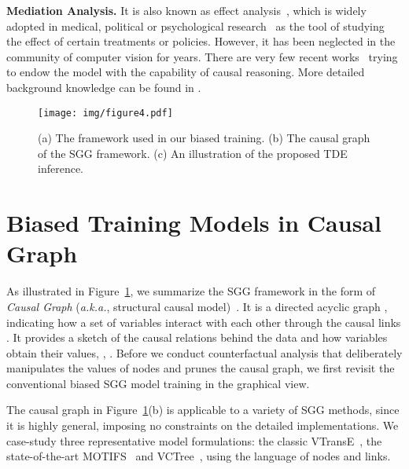 \documentclass[10pt,twocolumn,letterpaper]{article}
\begin{document}
\noindent\textbf{Mediation Analysis.} It is also known as effect analysis~\cite{vanderweele2015explanation, Judea2018thebookofwhy}, which is widely adopted in medical, political or psychological research~\cite{richiardi2013mediation, keele2015statistics, dunn2015evaluation, mackinnon2007mediation, king2008political} as the tool of studying the effect of certain treatments or policies. However, it has been neglected in the community of computer vision for years. There are very few recent works~\cite{nair2019causal, kusner2017counterfactual, niu2020counterfactual, qi2019two, wang2020visual, yang2020deconfounded} trying to endow the model with the capability of causal reasoning. More detailed background knowledge can be found in \cite{pearl2016causal,Judea2018thebookofwhy, vanderweele2015explanation}. 

%
 



\begin{figure}[t]
   \begin{minipage}[b]{1.0\linewidth}
   \centerline{\texttt{[image: img/figure4.pdf]}}
   \end{minipage}
   \caption{(a) The framework used in our biased training. (b) The causal graph of the SGG framework. (c) An illustration of the proposed TDE inference.}
   \label{fig:4} \vspace{-0.2in}
\end{figure}

\section{Biased Training Models in Causal Graph}
\label{sec:biased_training}
As illustrated in Figure~\ref{fig:4}, we summarize the SGG framework in the form of \textit{Causal Graph} (\textit{a.k.a.}, structural causal model)~\cite{Judea2018thebookofwhy, pearl2000causality, pearl2016causal}. It is a directed acyclic graph , indicating how a set of variables  interact with each other through the causal links . It provides a sketch of the causal relations behind the data and how variables obtain their values, \eg, . Before we conduct counterfactual analysis that deliberately manipulates the values of nodes and prunes the causal graph, we first revisit the conventional biased SGG model training in the graphical view. 

The causal graph in Figure~\ref{fig:4}(b) is applicable to a variety of SGG methods, since it is highly general, imposing no constraints on the detailed implementations. We case-study three representative model formulations: the classic VTransE~\cite{zhang2017visual}, the state-of-the-art MOTIFS~\cite{zellers2018neural} and VCTree~\cite{tang2019learning}, using the language of nodes and links.
\end{document}
